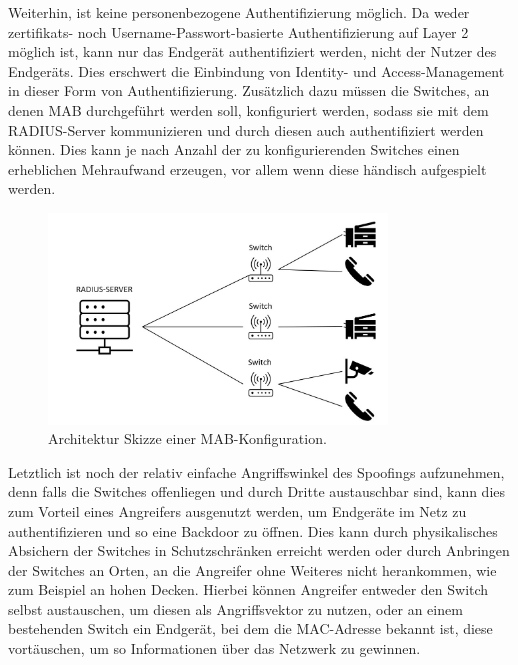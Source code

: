 \documentclass[conference]{IEEEtran}
\begin{document}
Weiterhin, ist keine personenbezogene Authentifizierung möglich. Da weder zertifikats- noch Username-Passwort-basierte Authentifizierung auf Layer 2 möglich ist, kann nur das Endgerät authentifiziert werden, nicht der Nutzer des Endgeräts. Dies erschwert die Einbindung von Identity- und Access-Management in dieser Form von Authentifizierung. Zusätzlich dazu müssen die Switches, an denen MAB durchgeführt werden soll, konfiguriert werden, sodass sie mit dem RADIUS-Server kommunizieren und durch diesen auch authentifiziert werden können. Dies kann je nach Anzahl der zu konfigurierenden Switches einen erheblichen Mehraufwand erzeugen, vor allem wenn diese händisch aufgespielt werden.\\


\begin{figure}[hbt]
	\centering
	\includegraphics[width=9cm]{figures/Server_Switch.jpg}
	\caption{Architektur Skizze einer MAB-Konfiguration.}
	\label{fig:mab_configuration}
\end{figure}


Letztlich ist noch der relativ einfache Angriffswinkel des Spoofings aufzunehmen, denn falls die Switches offenliegen und durch Dritte austauschbar sind, kann dies zum Vorteil eines Angreifers ausgenutzt werden, um Endgeräte im Netz zu authentifizieren und so eine Backdoor zu öffnen. Dies kann durch physikalisches Absichern der Switches in Schutzschränken erreicht werden oder durch Anbringen der Switches an Orten, an die Angreifer ohne Weiteres nicht herankommen, wie zum Beispiel an hohen Decken. Hierbei können Angreifer entweder den Switch selbst austauschen, um diesen als Angriffsvektor zu nutzen, oder an einem bestehenden Switch ein Endgerät, bei dem die MAC-Adresse bekannt ist, diese vortäuschen, um so Informationen über das Netzwerk zu gewinnen.\\
\end{document}
